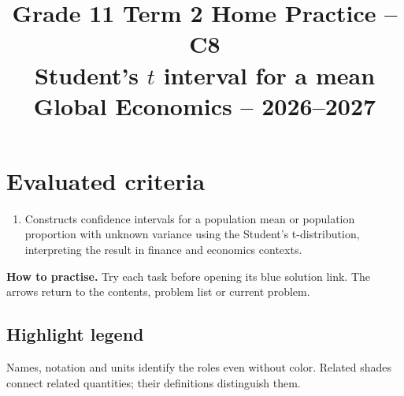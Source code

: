 \makeatletter
{}
\makeatother




\CoordinatedTermTwoPalette
\usepackage{needspace}
\usepackage{titling}
\setlength{\droptitle}{-2em}
\pretitle{\par\begingroup\centering\LARGE}
\posttitle{\par\endgroup}
\preauthor{}\postauthor{}
\predate{}\postdate{}
\maketitlehookd{\vspace{-1em}}
\linespread{1.12}
\setlength{\parskip}{5pt}

\title{Grade 11 Term 2 Home Practice -- C8\\\large Student's \(t\) interval for a mean\\[0.25em]
	\normalsize Global Economics -- 2026--2027}
\author{}
\date{}


	\maketitle

	\setcounter{tocdepth}{1}
	\setcounter{secnumdepth}{2}
	\label{toc}
	\tableofcontents

	\section*{Evaluated criteria}
	\begin{enumerate}[label=\textbf{C\arabic*},start=8]
		\item Constructs confidence intervals for a population mean or population proportion with unknown variance using the Student's t-distribution, interpreting the result in finance and economics contexts.
	\end{enumerate}

	\textbf{How to practise.} Try each task before opening its blue solution link. The arrows return to the contents, problem list or current problem.


\subsection*{Highlight legend}
\label{tab:highlight-legend}
Names, notation and units identify the roles even without color. Related shades connect related quantities; their definitions distinguish them.

